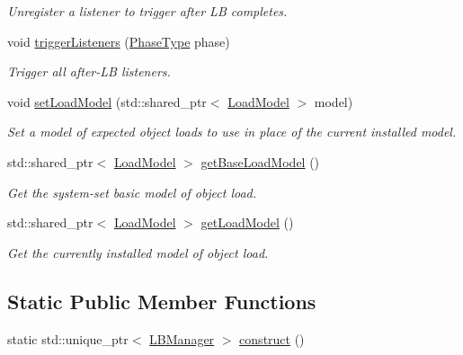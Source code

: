 \begin{DoxyCompactItemize}
\begin{DoxyCompactList}\small\item\em Unregister a listener to trigger after LB completes. \end{DoxyCompactList}\item 
void \hyperlink{structvt_1_1vrt_1_1collection_1_1balance_1_1_l_b_manager_a9baae1400676077dbe9b8f1805fab395}{trigger\+Listeners} (\hyperlink{namespacevt_a46ce6733d5cdbd735d561b7b4029f6d7}{Phase\+Type} phase)
\begin{DoxyCompactList}\small\item\em Trigger all after-\/\+LB listeners. \end{DoxyCompactList}\item 
void \hyperlink{structvt_1_1vrt_1_1collection_1_1balance_1_1_l_b_manager_a57813a70e0395907021a14c9e2bc1916}{set\+Load\+Model} (std\+::shared\+\_\+ptr$<$ \hyperlink{classvt_1_1vrt_1_1collection_1_1balance_1_1_load_model}{Load\+Model} $>$ model)
\begin{DoxyCompactList}\small\item\em Set a model of expected object loads to use in place of the current installed model. \end{DoxyCompactList}\item 
std\+::shared\+\_\+ptr$<$ \hyperlink{classvt_1_1vrt_1_1collection_1_1balance_1_1_load_model}{Load\+Model} $>$ \hyperlink{structvt_1_1vrt_1_1collection_1_1balance_1_1_l_b_manager_a9822187c2745a7b3b9c4a5929f8e3cc4}{get\+Base\+Load\+Model} ()
\begin{DoxyCompactList}\small\item\em Get the system-\/set basic model of object load. \end{DoxyCompactList}\item 
std\+::shared\+\_\+ptr$<$ \hyperlink{classvt_1_1vrt_1_1collection_1_1balance_1_1_load_model}{Load\+Model} $>$ \hyperlink{structvt_1_1vrt_1_1collection_1_1balance_1_1_l_b_manager_aaa442ee117e8c9c978c77275cb3e6404}{get\+Load\+Model} ()
\begin{DoxyCompactList}\small\item\em Get the currently installed model of object load. \end{DoxyCompactList}\end{DoxyCompactItemize}
\subsection*{Static Public Member Functions}
\begin{DoxyCompactItemize}
\item 
static std\+::unique\+\_\+ptr$<$ \hyperlink{structvt_1_1vrt_1_1collection_1_1balance_1_1_l_b_manager}{L\+B\+Manager} $>$ \hyperlink{structvt_1_1vrt_1_1collection_1_1balance_1_1_l_b_manager_ae8e69a0540bb87b40ee86d2c1fe31cd5}{construct} ()
\end{DoxyCompactItemize}

